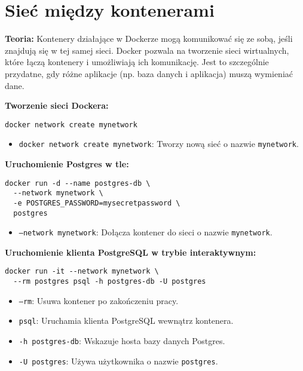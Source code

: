\documentclass{article}
\begin{document}
\section{Sieć między kontenerami}

\textbf{Teoria:}  
Kontenery działające w Dockerze mogą komunikować się ze sobą, jeśli znajdują się w tej samej sieci. Docker pozwala na tworzenie sieci wirtualnych, które łączą kontenery i umożliwiają ich komunikację. Jest to szczególnie przydatne, gdy różne aplikacje (np. baza danych i aplikacja) muszą wymieniać dane.

\textbf{Tworzenie sieci Dockera:}

\noindent\begin{lstlisting}
docker network create mynetwork
\end{lstlisting}

\begin{itemize}
    \item \texttt{docker network create mynetwork}: Tworzy nową sieć o nazwie \texttt{mynetwork}.
\end{itemize}

\textbf{Uruchomienie Postgres w tle:}

\noindent\begin{lstlisting}
docker run -d --name postgres-db \
  --network mynetwork \
  -e POSTGRES_PASSWORD=mysecretpassword \
  postgres
\end{lstlisting}

\begin{itemize}
    \item \texttt{--network mynetwork}: Dołącza kontener do sieci o nazwie \texttt{mynetwork}.
\end{itemize}

\textbf{Uruchomienie klienta PostgreSQL w trybie interaktywnym:}

\noindent\begin{lstlisting}
docker run -it --network mynetwork \
  --rm postgres psql -h postgres-db -U postgres
\end{lstlisting}

\begin{itemize}
    \item \texttt{--rm}: Usuwa kontener po zakończeniu pracy.
    \item \texttt{psql}: Uruchamia klienta PostgreSQL wewnątrz kontenera.
    \item \texttt{-h postgres-db}: Wskazuje hosta bazy danych Postgres.
    \item \texttt{-U postgres}: Używa użytkownika o nazwie \texttt{postgres}.
\end{itemize}
\end{document}
